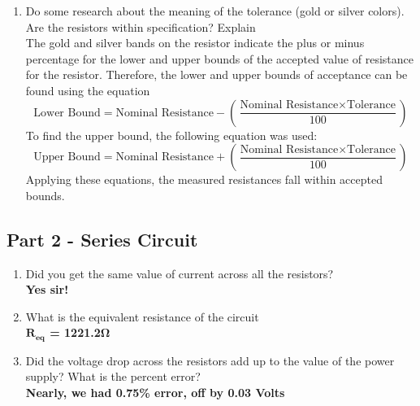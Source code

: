 \documentclass[titlepage]{article}
\begin{document}
\begin{enumerate}
        \item Do some research about the meaning of the tolerance (gold or silver colors). Are the resistors within specification? Explain\\
		The gold and silver bands on the resistor indicate the plus or minus percentage for the lower and upper bounds of the accepted value of resistance for the resistor. Therefore, the lower and upper bounds of acceptance can be found using the equation 
\[\text{Lower Bound} = \text{Nominal Resistance} - \left(\frac{\text{Nominal Resistance} \times \text{Tolerance}}{100}\right)\] 
To find the upper bound, the following equation was used:
\[\text{Upper Bound} = \text{Nominal Resistance} + \left(\frac{\text{Nominal Resistance} \times \text{Tolerance}}{100}\right)\] 
Applying these equations, the measured resistances fall within accepted bounds.
    \end{enumerate}
    \FloatBarrier


\subsection*{Part 2 - Series Circuit} 
    \begin{enumerate} 
        \item Did you get the same value of current across all the resistors? \\ 
            \textbf{Yes sir!}
        \item What is the equivalent resistance of the circuit\\ 
            \textbf{$\mathbf{R_{eq}}$ = 1221.2$\mathbf{\Omega}$ }

        \item Did the voltage drop across the resistors add up to the value of the power supply? What is the percent error?\\ 
            \textbf{Nearly, we had 0.75\% error, off by 0.03 Volts}


    \end{enumerate}
\end{document}
